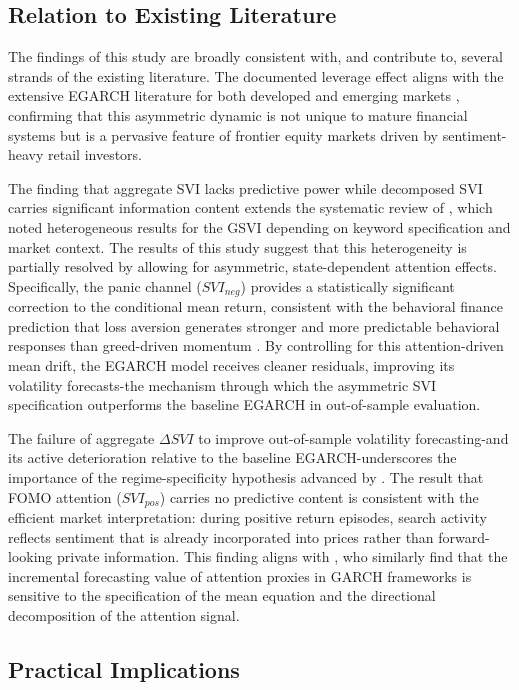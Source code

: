 \documentclass[12pt, a4paper]{article}
\begin{document}
\subsection{Relation to Existing Literature}

The findings of this study are broadly consistent with, and contribute to, several strands of the existing literature. The documented leverage effect aligns with the extensive EGARCH literature for both developed and emerging markets \citep{nelson1991, black1976}, confirming that this asymmetric dynamic is not unique to mature financial systems but is a pervasive feature of frontier equity markets driven by sentiment-heavy retail investors.

The finding that aggregate SVI lacks predictive power while decomposed SVI carries significant information content extends the systematic review of \citet{ayala2024}, which noted heterogeneous results for the GSVI depending on keyword specification and market context. The results of this study suggest that this heterogeneity is partially resolved by allowing for asymmetric, state-dependent attention effects. Specifically, the panic channel ($SVI_{neg}$) provides a statistically significant correction to the conditional mean return, consistent with the behavioral finance prediction that loss aversion generates stronger and more predictable behavioral responses than greed-driven momentum \citep{kahneman1979}. By controlling for this attention-driven mean drift, the EGARCH model receives cleaner residuals, improving its volatility forecasts-the mechanism through which the asymmetric SVI specification outperforms the baseline EGARCH in out-of-sample evaluation.

The failure of aggregate $\Delta SVI$ to improve out-of-sample volatility forecasting-and its active deterioration relative to the baseline EGARCH-underscores the importance of the regime-specificity hypothesis advanced by \citet{fong2002}. The result that FOMO attention ($SVI_{pos}$) carries no predictive content is consistent with the efficient market interpretation: during positive return episodes, search activity reflects sentiment that is already incorporated into prices rather than forward-looking private information. This finding aligns with \citet{hamid2015}, who similarly find that the incremental forecasting value of attention proxies in GARCH frameworks is sensitive to the specification of the mean equation and the directional decomposition of the attention signal.

\subsection{Practical Implications}
\end{document}
